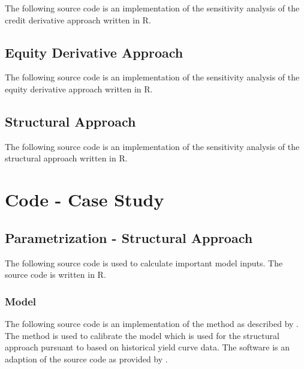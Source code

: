 The following source code is an implementation of the sensitivity analysis of the credit derivative approach \citep{de2011pricing} written in R.
 


\section{Equity Derivative Approach} \label{sensiequity}

The following source code is an implementation of the sensitivity analysis of the equity derivative approach \citep{de2011pricing} written in R.
 


\section{Structural Approach} \label{sensistructural}

The following source code is an implementation of the sensitivity analysis of the structural approach \citep{pennacchi2010structural} written in R.
 


\chapter{Code - Case Study}

\section{Parametrization - Structural Approach} \label{empirical}
The following source code is used to calculate important model inputs. The source code is written in R.


\subsection{\citet{cox1985theory} Model}

The following source code is an implementation of the method as described by \citet{remillard2013statistical}. The method is used to calibrate the \citet{cox1985theory} model which is used for the structural approach pursuant to \citet{pennacchi2010structural} based on historical yield curve data. The software is an adaption of the source code as provided by \citet{calibrateCIR}.

